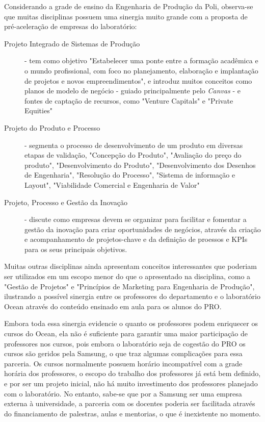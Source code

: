 Considerando a grade de ensino da Engenharia de Produção da Poli, observa-se que muitas disciplinas possuem uma sinergia muito grande com a proposta de pré-aceleração de empresas do laboratório: 

\begin{description}
\item[Projeto Integrado de Sistemas de Produção] - tem como objetivo "Estabelecer uma ponte entre a formação acadêmica e o mundo profissional, com foco no planejamento, elaboração e implantação de projetos e novos empreendimentos", e introduz muitos conceitos como planos de modelo de negócio - guiado principalmente pelo \textit{Canvas} - e fontes de captação de recursos, como "Venture Capitals" e "Private Equities"

\item[Projeto do Produto e Processo] - segmenta o processo de desenvolvimento de um produto em diversas etapas de validação, "Concepção do Produto", "Avaliação do preço do produto", "Desenvolvimento do Produto", "Desenvolvimento dos Desenhos de Engenharia", "Resolução do Processo", "Sistema de informação e Layout", "Viabilidade Comercial e Engenharia de Valor"

\item[Projeto, Processo e Gestão da Inovação] - discute como empresas devem se organizar para facilitar e fomentar a gestão da inovação para criar oportunidades de negócios, através da criação e acompanhamento de projetos-chave e da definição de proessos e KPIs para os seus principais objetivos.

\end{description}

Muitas outras disciplinas ainda apresentam conceitos interessantes que poderiam ser utilizados em um escopo menor do que o apresentado na disciplina, como a "Gestão de Projetos" e "Princípios de Marketing para Engenharia de Produção", ilustrando a possível sinergia entre os professores do departamento e o laboratório Ocean através do conteúdo ensinado em aula para os alunos do PRO.

Embora toda essa sinergia evidencie o quanto os professores podem enriquecer os cursos do Ocean, ela não é suficiente para garantir uma maior participação de professores nos cursos, pois embora o laboratório seja de cogestão do PRO os cursos são geridos pela Samsung, o que traz algumas complicações para essa parceria. Os cursos normalmente possuem horário incompatível com a grade horária dos professores, o escopo do trabalho dos professores já está bem definido, e por ser um projeto inicial, não há muito investimento dos professores planejado com o laboratório. No entanto, sabe-se que por a Samsung ser uma empresa externa à universidade, a parceria com os docentes poderia ser facilitada através do financiamento de palestras, aulas e mentorias, o que é inexistente no momento.

